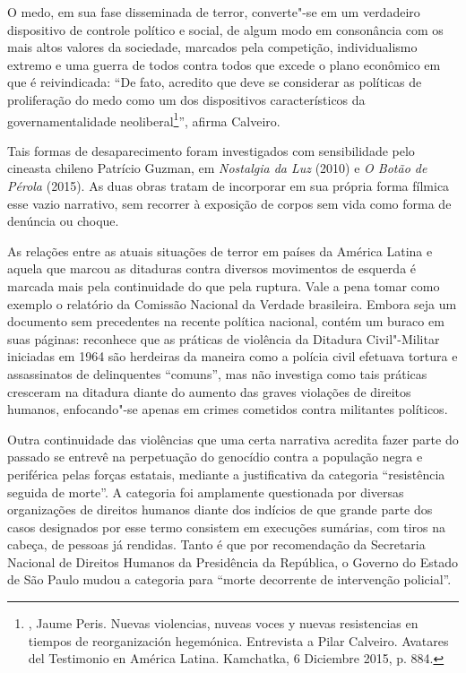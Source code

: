 O medo, em sua fase disseminada de terror, converte"-se em um verdadeiro
dispositivo de controle político e social, de algum modo em consonância
com os mais altos valores da sociedade, marcados pela competição,
individualismo extremo e uma guerra de todos contra todos que excede o
plano econômico em que é reivindicada: ``De fato, acredito que deve se
considerar as políticas de proliferação do medo como um dos dispositivos
característicos da governamentalidade neoliberal\footnote{, Jaume
  Peris. Nuevas violencias, nuveas voces y nuevas resistencias en
  tiempos de reorganización hegemónica. Entrevista a Pilar Calveiro.
  Avatares del Testimonio en América Latina. Kamchatka, 6 Diciembre
  2015, p. 884.}'', afirma Calveiro.

Tais formas de desaparecimento foram investigados com sensibilidade pelo
cineasta chileno Patrício Guzman, em \emph{Nostalgia da Luz} (2010) e
\emph{O Botão de Pérola} (2015). As duas obras tratam de incorporar em
sua própria forma fílmica esse vazio narrativo, sem recorrer à exposição
de corpos sem vida como forma de denúncia ou choque.

\asterisc

As relações entre as atuais situações de terror em países da América
Latina e aquela que marcou as ditaduras contra diversos movimentos de
esquerda é marcada mais pela continuidade do que pela ruptura. Vale a
pena tomar como exemplo o relatório da Comissão Nacional da Verdade
brasileira. Embora seja um documento sem precedentes na recente política
nacional, contém um buraco em suas páginas: reconhece que as práticas de
violência da Ditadura Civil"-Militar iniciadas em 1964 são herdeiras da
maneira como a polícia civil efetuava tortura e assassinatos de
delinquentes ``comuns'', mas não investiga como tais práticas cresceram
na ditadura diante do aumento das graves violações de direitos humanos,
enfocando"-se apenas em crimes cometidos contra militantes políticos.

Outra continuidade das violências que uma certa narrativa acredita fazer
parte do passado se entrevê na perpetuação do genocídio contra a
população negra e periférica pelas forças estatais, mediante a
justificativa da categoria ``resistência seguida de morte''. A categoria
foi amplamente questionada por diversas organizações de direitos humanos
diante dos indícios de que grande parte dos casos designados por esse
termo consistem em execuções sumárias, com tiros na cabeça, de pessoas
já rendidas. Tanto é que por recomendação da Secretaria Nacional de
Direitos Humanos da Presidência da República, o Governo do Estado de São
Paulo mudou a categoria para ``morte decorrente de intervenção
policial''.

